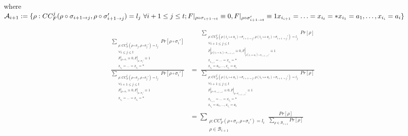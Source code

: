 where 
$  
\mathcal{A}_{i+1} := \{\rho: CC_F^{j}(\rho\circ \sigma_{i+1 \to j}, \rho \circ \sigma_{i+1 \to j}')= l_j \ \forall i+1\leq j \leq t; \\
F|_{\rho\circ \sigma_{i+1 \to t}} \equiv 0, F|_{\rho\circ \sigma_{i+1 \to t}'}\equiv 1\;\\
x_{i_{i+1}}=\ldots= x_{i_t} = *\\ 
x_{i_1} = a_1, \dots, x_{i_i}=a_i \}
$




\begin{align*}
\frac{
\underset{\substack{\rho: CC_F^{j}(\rho\circ \sigma_j, \rho \circ \sigma_j')= l_j\\ \forall i\leq j \leq t\\ F|_{\rho\circ \sigma_t} \equiv 0, F|_{\rho\circ \sigma_t'}\equiv 1\\x_{i_1}=\ldots= x_{i_t} = *}} {\sum} Pr[\rho \circ \sigma_{i}']
}
{
\underset{\substack{\rho: CC_F^{j}(\rho\circ \sigma_j, \rho \circ \sigma_j')= l_j\\ \forall i+1\leq j \leq t\\F|_{\rho\circ \sigma_t} \equiv 0, F|_{\rho\circ \sigma_t'}\equiv 1\\x_{i_{1}}=\ldots= x_{i_t} = *}} {\sum} Pr[\rho\circ \sigma_{i}' ]
}
&= \
\frac{
\underset{\substack{\rho: CC_F^{j}(\rho(i_i \mapsto a_i)\circ \sigma_{i+1 \to j}, \rho(i_i \mapsto a_i) \circ \sigma_{i+1 \to j}')= l_j\\ \forall i+1\leq j \leq t\\ F|_{\rho(i_i \mapsto a_i)\circ \sigma_{i+1 \to t}} \equiv 0, F|_{\rho(i_i \mapsto a_i)\circ \sigma_{i+1 \to t}'}\equiv 1\\x_{i_{i+1}}=\ldots= x_{i_t} = *\\ x_{i_1} = a_1, \dots, x_{i_i}=a_i }} {\sum} Pr[\rho]
}
{
\underset{\substack{\rho: CC_F^{j}(\rho(i_i \mapsto a_i)\circ \sigma_{i+1 \to j}, \rho(i_i \mapsto a_i) \circ \sigma_{i+1 \to j}')= l_j\\ \forall i+1\leq j \leq t\\F|_{\rho\circ \sigma_{i+1 \to t}} \equiv 0, F|_{\rho\circ \sigma_{i+1 \to t}'}\equiv 1\\x_{i_{i+1}}=\ldots= x_{i_t} = *\\ x_{i_1} = a_1, \dots, x_{i_i}=a_i }} {\sum} Pr[\rho ]
}\\
&= 
\underset{\substack{\rho: CC_F^{i}(\rho\circ \sigma_i, \rho \circ \sigma_i')= l_i\\ \rho \in \mathcal{B}_{i+1}}}{\sum} \frac{Pr[\rho]
}{\underset{\rho \in \mathcal{B}_{i+1}} {\sum} Pr[\rho ]} 
\end{align*}

